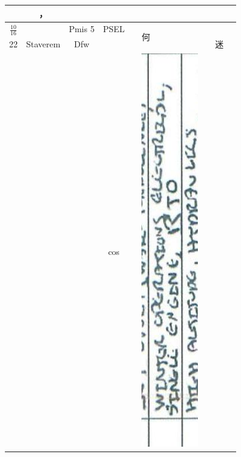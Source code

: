\documentclass[10pt]{article}
\begin{document}
\begin{center}
\begin{tabular}{|c|c|c|c|c|c|c|c|c|c|}
{} & ， &  &  \\
\hline
\(\frac{10}{16}\) &  & Pmis 5 & PSEL & \multirow[t]{2}{*}{} & \multicolumn{2}{|l|}{\multirow[t]{2}{*}{何}} &  &  &  \\
\hline
22 & Staverem & Dfw &  &  &  &  &  & 迷 &  \\
\hline
 &  &  & cos & \multirow[t]{2}{*}{} & \multicolumn{2}{|l|}{\includegraphics[max width=\textwidth]{2025_02_27_dd68c3d38de88f0516d9g-053(7)}
}
\end{tabular}
\end{center}
\end{document}
